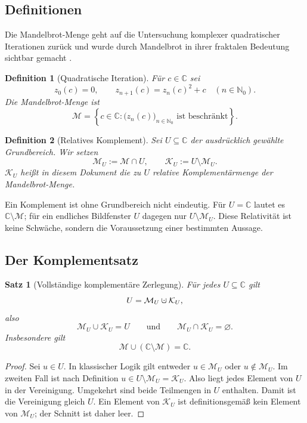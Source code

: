 \documentclass[11pt,a4paper]{article}
\newtheorem{definition}{Definition}[section]
\newtheorem{satz}{Satz}[section]
\theoremstyle{remark}
\newcommand{\M}{\mathcal{M}}
\newcommand{\K}{\mathcal{K}}
\newcommand{\C}{\mathbb{C}}
\newcommand{\N}{\mathbb{N}}
\newcommand{\dotcup}{\mathbin{\mathaccent\cdot\cup}}
\begin{document}
\subsection{Definitionen}

Die Mandelbrot-Menge geht auf die Untersuchung komplexer quadratischer
Iterationen zurück und wurde durch Mandelbrot in ihrer fraktalen Bedeutung
sichtbar gemacht \citep{mandelbrot1980}.

\begin{definition}[Quadratische Iteration]
Für \(c\in\C\) sei
\[
  z_0(c)=0,
  \qquad
  z_{n+1}(c)=z_n(c)^2+c
  \quad(n\in\N_0).
\]
Die Mandelbrot-Menge ist
\[
  \M
  =
  \left\{
    c\in\C:
    \bigl(z_n(c)\bigr)_{n\in\N_0}
    \text{ ist beschränkt}
  \right\}.
\]
\end{definition}

\begin{definition}[Relatives Komplement]
Sei \(U\subseteq\C\) der ausdrücklich gewählte Grundbereich. Wir setzen
\[
  \M_U:=\M\cap U,
  \qquad
  \K_U:=U\setminus\M_U.
\]
\(\K_U\) heißt in diesem Dokument die zu \(U\) relative
Komplementärmenge der Mandelbrot-Menge.
\end{definition}

Ein Komplement ist ohne Grundbereich nicht eindeutig. Für \(U=\C\) lautet es
\(\C\setminus\M\); für ein endliches Bildfenster \(U\) dagegen nur
\(U\setminus\M_U\). Diese Relativität ist keine Schwäche, sondern die
Voraussetzung einer bestimmten Aussage.

\subsection{Der Komplementsatz}

\begin{satz}[Vollständige komplementäre Zerlegung]
\label{satz:komplement}
Für jedes \(U\subseteq\C\) gilt
\[
  U=\M_U\dotcup\K_U,
\]
also
\[
  \M_U\cup\K_U=U
  \qquad\text{und}\qquad
  \M_U\cap\K_U=\varnothing.
\]
Insbesondere gilt
\[
  \M\cup(\C\setminus\M)=\C.
\]
\end{satz}

\begin{proof}
Sei \(u\in U\). In klassischer Logik gilt entweder
\(u\in\M_U\) oder \(u\notin\M_U\). Im zweiten Fall ist nach Definition
\(u\in U\setminus\M_U=\K_U\). Also liegt jedes Element von \(U\) in der
Vereinigung. Umgekehrt sind beide Teilmengen in \(U\) enthalten. Damit ist die
Vereinigung gleich \(U\). Ein Element von \(\K_U\) ist definitionsgemäß kein
Element von \(\M_U\); der Schnitt ist daher leer.
\end{proof}
\end{document}
